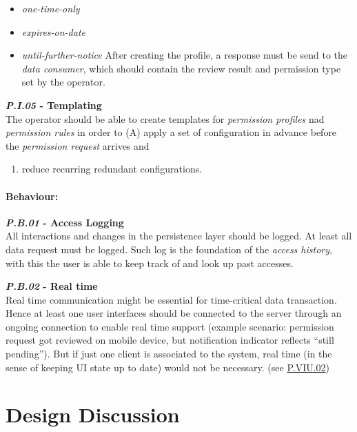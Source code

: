 \documentclass[12pt,english,a4paper,titlepage,cleardoublepage=empty,dottedtoc]{report}
\providecommand{\tightlist}{%
  \setlength{\itemsep}{0pt}\setlength{\parskip}{0pt}}
\begin{document}
\begin{itemize}
\tightlist
\item
  \emph{one-time-only}
\item
  \emph{expires-on-date}
\item
  \emph{until-further-notice} After creating the profile, a response
  must be send to the \emph{data consumer}, which should contain the
  review result and permission type set by the operator.
\end{itemize}

\textbf{\emph{\protect\hypertarget{pi05}{}{P.I.05}} - Templating}\\
The operator should be able to create templates for \emph{permission
profiles} nad \emph{permission rules} in order to (A) apply a set of
configuration in advance before the \emph{permission request} arrives
and

\begin{enumerate}
\def\labelenumi{(\Alph{enumi})}
\setcounter{enumi}{1}
\tightlist
\item
  reduce recurring redundant configurations.
\end{enumerate}

\subsubsection{Behaviour:}\label{behaviour}

\textbf{\emph{\protect\hypertarget{pb01}{}{P.B.01}} - Access Logging}\\
All interactions and changes in the persistence layer should be logged.
At least all data request must be logged. Such log is the foundation of
the \emph{access history}, with this the user is able to keep track of
and look up past accesses.

\textbf{\emph{\protect\hypertarget{pb02}{}{P.B.02}} - Real time}\\
Real time communication might be essential for time-critical data
transaction. Hence at least one user interfaces should be connected to
the server through an ongoing connection to enable real time support
(example scenario: permission request got reviewed on mobile device, but
notification indicator reflects ``still pending''). But if just one
client is associated to the system, real time (in the sense of keeping
UI state up to date) would not be necessary. (see
\protect\hyperlink{pviu02ux5cux257D}{P.VIU.02})

\chapter{Design Discussion}\label{design-discussion}
\end{document}
